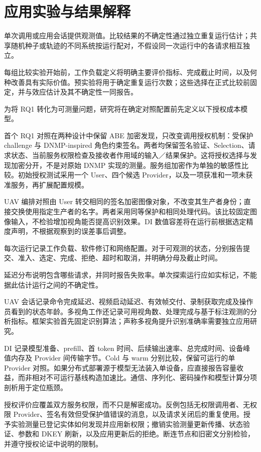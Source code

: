 \section{应用实验与结果解释}
单次调用或应用会话提供观测值。比较结果的不确定性通过独立重复运行估计；共享随机种子或轨迹的不同系统按运行配对，不假设同一次运行中的各请求相互独立。

每组比较实验开始前，工作负载定义将明确主要评价指标、完成截止时间，以及何种改善具有实际价值。预实验将用于确定重复运行次数；这些选择在正式比较前固定，并与效应估计及其不确定性一同报告。

为将 RQ1 转化为可测量问题，研究将在确定对照配置前先定义以下授权成本模型。

首个 RQ1 对照在两种设计中保留 ABE 加密发现，只改变调用授权机制：受保护 challenge 与 DNMP-inspired 角色约束签名。两者均保留签名验证、Selection、请求状态、当前服务权限检查及接收者作用域的输入／结果保护。这将授权选择与发现加密分开，不是对原始 DNMP 实现的测量。服务组加密作为单独的敏感性比较。初始授权测试采用一个 User、四个候选 Provider，以及一项获准和一项未获准服务，再扩展配置规模。



UAV 编排对照由 User 转交相同的签名加密图像对象，不改变其生产者身份；直接交换使用指定生产者的名字。两者采用同等保护和相同处理代码。该比较固定图像输入，不检验增加视角能否提高识别效果。DI 数值容差将在运行前根据选定精度声明，不根据观察到的误差事后调整。

每次运行记录工作负载、软件修订和网络配置。对于可观测的状态，分别报告提交、准入、选定、完成、拒绝、超时和取消，并明确分母及截止时间。

延迟分布说明包含哪些请求，并同时报告失败率。单次探索运行应如实标记，不能据此估计运行之间的不确定性。

UAV 会话记录命令完成延迟、视频启动延迟、有效帧交付、录制获取完成及操作员看到的状态年龄。多视角工作还记录可用视角数、处理完成与基于标注观测的分析指标。框架实验首先固定识别算法；声称多视角提升识别准确率需要独立应用研究。

DI 记录模型准备、prefill、首 token 时间、后续输出速率、总完成时间、设备峰值内存及 Provider 间传输字节。Cold 与 warm 分别比较，保留可运行的单 Provider 对照。如果分布式部署源于模型无法装入单设备，应直接报告容量收益，而非相对不可运行基线构造加速比。通信、序列化、密码操作和模型计算分项剖析用于定位瓶颈。

授权评价应覆盖双方服务权限，而不只是解密成功。反例包括无权限调用者、无权限 Provider、签名有效但受保护值错误的消息，以及请求关闭后的重复使用。授予实验测量已登记实体如何发现并应用新权限；撤销实验测量更新传播、状态验证、参数和 DKEY 刷新，以及应用更新后的拒绝。断连节点和旧密文分别检验，并遵守授权论证中说明的限制。

